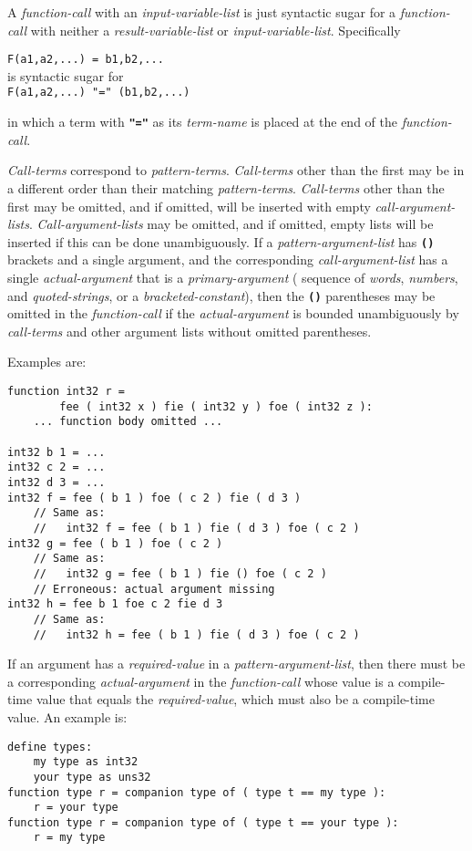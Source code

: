 \documentclass[12pt]{article}
\newcommand{\TT}[1]{{\tt \bfseries #1}}
\newenvironment{indpar}[1][0.3in]%
	{\begin{list}{}%
		     {\setlength{\itemsep}{0in}%
		      \setlength{\topsep}{0in}%
		      \setlength{\parsep}{1ex}%
		      \setlength{\labelwidth}{#1}%
		      \setlength{\leftmargin}{#1}%
		      \addtolength{\leftmargin}{\labelsep}}%
	 \item}%
	{\end{list}}
\begin{document}
A {\em function-call} with an {\em input-variable-list} is just syntactic
sugar for a {\em function-call} with neither a {\em result-variable-list}
or {\em input-variable-list}.  Specifically
\begin{center}
{\tt F(a1,a2,...)~=~b1,b2,...} \\
is syntactic sugar for \\
{\tt F(a1,a2,...)~"="~(b1,b2,...)} \\
\end{center}

in which a term with \TT{"="} as its {\em term-name} is
placed at the end of the {\em function-call}.

{\em Call-terms} correspond to {\em pattern-terms}.  {\em Call-terms}
other than the first may be in a different order than their matching
{\em pattern-terms}.  {\em Call-terms} other than the first may be
omitted, and if omitted, will be inserted with empty {\em call-argument-lists}.
{\em Call-argument-lists} may be omitted, and if omitted, empty
lists will be inserted if this can be done unambiguously.
If a {\em pattern-argument-list} has \TT{()} brackets and a single
argument, and the corresponding {\em call-argument-list} has a single
{\em actual-argument} that
is a {\em primary-argument} ( sequence of {\em words}, {\em numbers},
and {\em quoted-strings}, or a {\em bracketed-constant}), then
the \TT{()} parentheses may be omitted in the {\em function-call}
if the {\em actual-argument} is bounded unambiguously by {\em call-terms}
and other argument lists without omitted parentheses.

Examples are:
\begin{indpar}\begin{verbatim}
function int32 r =
        fee ( int32 x ) fie ( int32 y ) foe ( int32 z ):
    ... function body omitted ...

int32 b 1 = ...
int32 c 2 = ...
int32 d 3 = ...
int32 f = fee ( b 1 ) foe ( c 2 ) fie ( d 3 )
    // Same as:
    //   int32 f = fee ( b 1 ) fie ( d 3 ) foe ( c 2 )
int32 g = fee ( b 1 ) foe ( c 2 )
    // Same as:
    //   int32 g = fee ( b 1 ) fie () foe ( c 2 )
    // Erroneous: actual argument missing
int32 h = fee b 1 foe c 2 fie d 3
    // Same as:
    //   int32 h = fee ( b 1 ) fie ( d 3 ) foe ( c 2 )
\end{verbatim}\end{indpar}

If an argument has a {\em required-value} in a {\em pattern-argument-list},
then there must be a corresponding {\em actual-argument} in the
{\em function-call} whose value is a compile-time value that equals the
{\em required-value}, which must also be a compile-time value.  An example is:
\begin{indpar}\begin{verbatim}
define types:
    my type as int32
    your type as uns32
function type r = companion type of ( type t == my type ):
    r = your type
function type r = companion type of ( type t == your type ):
    r = my type
\end{verbatim}\end{indpar}
\end{document}
